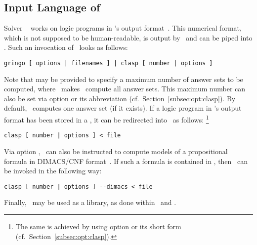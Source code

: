 \subsection{Input Language of \clasp}\label{subsec:lang:clasp}

Solver \clasp~\cite{gekanesc07b} works on logic programs in \lparse's
output format~\cite{lparseManual}.
This numerical format, which is not supposed to be human-readable,
is output by \gringo\ and can be piped into \clasp.
Such an invocation of \clasp\ looks as follows:
%
\begin{lstlisting}[numbers=none]
gringo [ options | filenames ] | clasp [ number | options ]
\end{lstlisting}
%
Note that  may be provided to specify a maximum number of answer sets
to be computed, where~ makes \clasp\ compute all answer sets.
This maximum number can also be set via
option  or its abbreviation 
(cf.\ Section~\ref{subsec:opt:clasp}).
By default, \clasp\ computes one answer set (if it exists).
If a logic program in \lparse's output format has been stored in a ,
it can be redirected into \clasp\ as follows:%
\footnote{%
  The same is achieved by using option  or its short form 
  (cf.\ Section~\ref{subsec:opt:clasp}).}
%
\begin{lstlisting}[numbers=none]
clasp [ number | options ] < file
\end{lstlisting}
%
Via option ,
\clasp\ can also be instructed to compute models of a propositional formula
in DIMACS/CNF format~\cite{dimacs}.
If such a formula is contained in ,
then \clasp\ can be invoked in the following way:
%
\begin{lstlisting}[numbers=none]
clasp [ number | options ] --dimacs < file
\end{lstlisting}
%
Finally, \clasp\ may be used as a library, as done within \clingo\ and \iclingo.


